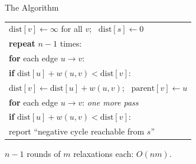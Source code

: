 \documentclass[10pt,aspectratio=169]{beamer}
\begin{document}
\begin{frame}{The Algorithm}
  \begin{center}
  \begin{tabular}{l}
    $\text{dist}[v] \gets \infty$ for all $v$; \ $\text{dist}[s] \gets 0$ \\
    \textbf{repeat} $n - 1$ times: \\
    \quad \textbf{for} each edge $u \to v$: \\
    \quad\quad \textbf{if} $\text{dist}[u] + w(u, v) < \text{dist}[v]$: \\
    \quad\quad\quad $\text{dist}[v] \gets \text{dist}[u] + w(u, v)$;
                    \ $\text{parent}[v] \gets u$ \\[6pt]
    \textbf{for} each edge $u \to v$: \hfill \textit{one more pass} \\
    \quad \textbf{if} $\text{dist}[u] + w(u, v) < \text{dist}[v]$: \\
    \quad\quad report ``negative cycle reachable from $s$''
  \end{tabular}
  \end{center}

  \bigskip
  \begin{center}
    $n - 1$ rounds of $m$ relaxations each: $O(nm)$.
  \end{center}
\end{frame}
\end{document}
